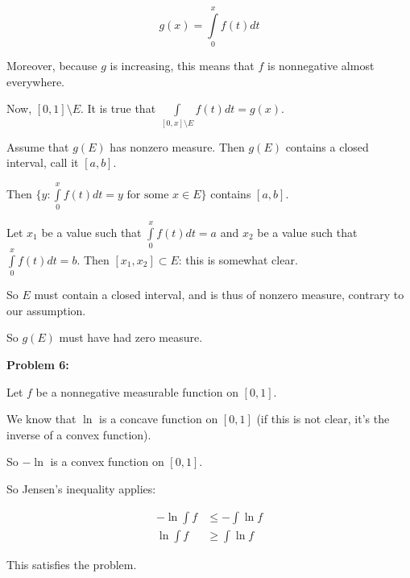 \documentclass[a4paper,12pt]{article}
\newcommand{\shunt}{\vspace{20mm}}
\begin{document}
\begin{displaymath}
g(x) = \int\limits_0^x f(t) dt
\end{displaymath}

Moreover, because $g$ is increasing, this means that $f$ is nonnegative almost everywhere. 

Now, $[0,1] \setminus E$. It is true that $\int\limits_{[0,x] \setminus E} f(t)dt = g(x)$.

Assume that $g(E)$ has nonzero measure. Then $g(E)$ contains a closed interval, call it $[a,b]$.

Then $\{y: \int\limits_0^x f(t) dt = y \text{ for some } x \in E\}$ contains $[a,b]$.

Let $x_1$ be a value such that $\int\limits_0^x f(t) dt = a$ and $x_2$ be a value such that $\int\limits_0^x f(t) dt = b$. Then $[x_1,x_2] \subset E$: this is somewhat clear.

So $E$ must contain a closed interval, and is thus of nonzero measure, contrary to our assumption.

So $g(E)$ must have had zero measure.

\shunt

{\bf Problem 6:} 

Let $f$ be a nonnegative measurable function on $[0,1]$.

We know that $\ln$ is a concave function on $[0,1]$ (if this is not clear, it's the inverse of a convex function).

So $-\ln$ is a convex function on $[0,1]$.

So Jensen's inequality applies:

\begin{align*}
-\ln \int f &\leq -\int\ln f \\
\ln \int f & \geq \int \ln f
\end{align*}

This satisfies the problem.

\shunt
\end{document}
